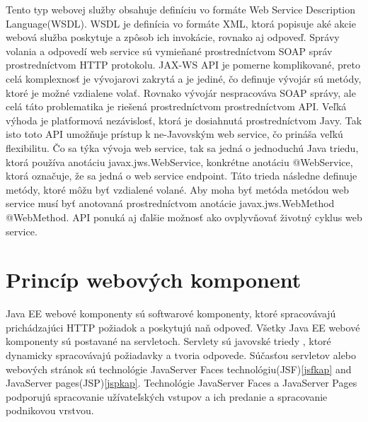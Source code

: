  Tento typ webovej služby obsahuje definíciu vo formáte Web Service Description Language(WSDL). WSDL je definícia vo formáte XML, ktorá popisuje aké akcie webová služba poskytuje a zpôsob ich invokácie, rovnako  aj odpoveď. Správy volania a odpovedí web service sú vymieňané prostredníctvom SOAP správ prostredníctvom HTTP protokolu. JAX-WS API je pomerne komplikované, preto celá komplexnosť je vývojarovi zakrytá a je jediné, čo definuje vývojár sú metódy, ktoré je možné vzdialene volať. Rovnako vývojár nespracováva SOAP správy, ale celá táto problematika je riešená prostredníctvom prostredníctvom API. Veľká výhoda je platformová nezávislosť, ktorá je dosiahnutá prostredníctvom Javy. Tak isto toto API umožňuje prístup k ne-Javovským web service, čo prináša veľkú flexibilitu. Čo sa týka vývoja web service, tak sa jedná o jednoduchú Java triedu, ktorá používa anotáciu javax.jws.WebService, konkrétne anotáciu @WebService, ktorá označuje, že sa jedná o web service endpoint. Táto trieda následne definuje metódy, ktoré môžu byť vzdialené volané. Aby moha byť metóda metódou web service musí byť anotovaná prostredníctvom anotácie  javax.jws.WebMethod @WebMethod. API ponuká aj ďalšie možnosť ako ovplyvňovať životný cyklus web service. 





\section{Princíp webových komponent}
Java EE webové komponenty sú softwarové komponenty, ktoré spracovávajú prichádzajúci HTTP požiadok a poskytujú naň odpoveď. Všetky Java EE webové komponenty sú postavané na servletoch. Servlety sú javovské triedy , ktoré dynamicky spracovávajú požiadavky a tvoria odpovede. Súčasťou servletov alebo webových stránok  sú technológie JavaServer Faces technológiu(JSF)\ref{jsfkap} and JavaServer pages(JSP)\ref{jspkap}. Technológie JavaServer Faces a JavaServer Pages podporujú spracovanie užívateľských vstupov a ich predanie a spracovanie podnikovou vrstvou.



